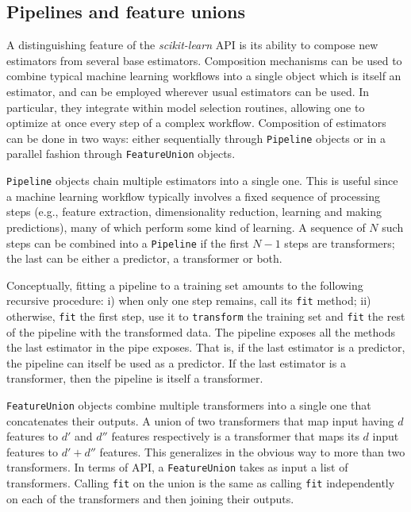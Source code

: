 \documentclass{llncs}
\newcommand{\sklearn}{\textit{scikit-learn}\xspace}
\begin{document}

\subsection{Pipelines and feature unions}

A distinguishing feature of the \sklearn API is its ability to
compose new estimators from several base estimators. Composition mechanisms can
be used to combine typical machine learning workflows into a single object which
is itself an estimator, and can be employed wherever usual estimators can be used.
In particular,
they integrate within model selection routines, allowing one to optimize at once
every step of a complex workflow. Composition of estimators can be done in two
ways: either sequentially through \texttt{Pipeline} objects or in a parallel
fashion through \texttt{FeatureUnion} objects.

\texttt{Pipeline} objects chain multiple estimators into a single one. This is
useful since a machine learning workflow typically involves a fixed sequence of
processing steps (e.g., feature extraction, dimensionality reduction, learning
and making predictions), many of which perform some kind of learning.
A sequence of $N$ such steps can be combined into a
\texttt{Pipeline} if the first $N-1$ steps are transformers; the last can be
either a predictor, a transformer or both.

Conceptually, fitting a pipeline to
a training set amounts to the following recursive procedure: i) when only one
step remains, call its \texttt{fit} method; ii) otherwise, \texttt{fit} the
first step, use it to \texttt{transform} the training set and \texttt{fit} the
rest of the pipeline with the transformed data. The pipeline exposes all the
methods the last estimator in the pipe exposes. That is, if the last estimator
is a predictor, the pipeline can itself be used as a predictor. If the last
estimator is a transformer, then the pipeline is itself a transformer.

\texttt{FeatureUnion} objects combine multiple transformers into a single one
that concatenates their outputs. A union of two transformers that
map input having $d$ features to $d'$ and $d''$ features respectively is
a transformer that maps its $d$ input features to $d' + d''$ features.
This generalizes in the obvious way to more than two transformers.
In terms of API, a \texttt{FeatureUnion} takes as input a list of transformers.
Calling \texttt{fit} on the union is the same as calling \texttt{fit}
independently on each of the transformers and then joining their outputs.
\end{document}
